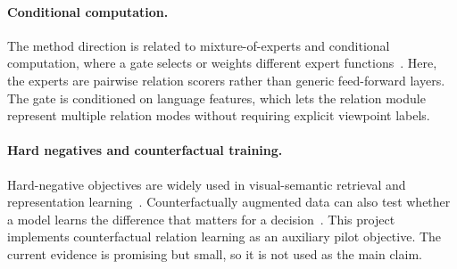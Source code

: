 \paragraph{Conditional computation.}
The method direction is related to mixture-of-experts and conditional computation, where a gate selects or weights different expert functions~\citep{jacobs1991adaptive,shazeer2017outrageously,fedus2022switch}. Here, the experts are pairwise relation scorers rather than generic feed-forward layers. The gate is conditioned on language features, which lets the relation module represent multiple relation modes without requiring explicit viewpoint labels.

\paragraph{Hard negatives and counterfactual training.}
Hard-negative objectives are widely used in visual-semantic retrieval and representation learning~\citep{faghri2018vse}. Counterfactually augmented data can also test whether a model learns the difference that matters for a decision~\citep{kaushik2020learning}. This project implements counterfactual relation learning as an auxiliary pilot objective. The current evidence is promising but small, so it is not used as the main claim.
